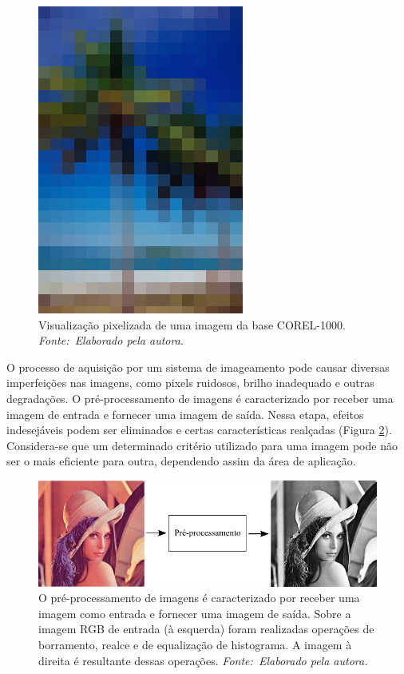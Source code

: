 \begin{figure}[!htbp]
 \begin{center}
   \includegraphics[width=0.4\linewidth]{figuras/pixel.jpg}
 \caption[Visualização pixelizada de uma imagem da base COREL-1000.]{Visualização pixelizada de uma imagem da base COREL-1000\footnotemark. \\ \textit{Fonte:~Elaborado pela autora.}}
 \label{fig:pixel}
 \end{center}
\end{figure}

O processo de aquisição por um sistema de imageamento pode causar diversas imperfeições nas imagens, como pixels ruidosos, brilho inadequado e outras degradações. O pré-processamento de imagens é caracterizado por receber uma imagem de entrada e fornecer uma imagem de saída. Nessa etapa, efeitos indesejáveis podem ser eliminados e certas características realçadas (Figura \ref{fig:preproc}). Considera-se que um determinado critério utilizado para uma imagem pode não ser o mais eficiente para outra, dependendo assim da área de aplicação.

\vspace{12pt}
\begin{figure}[!htbp]
 \begin{center}
   \includegraphics[width=1\linewidth]{figuras/preprocessamento.png}
 \caption[Sobre a imagem RGB de entrada foram realizadas operações de borramento, realce e de equalização de histograma. A imagem à direita é resultante dessas operações.]{O pré-processamento de imagens é caracterizado por receber uma imagem como entrada e fornecer uma imagem de saída. Sobre a imagem RGB de entrada (à esquerda) foram realizadas operações de borramento, realce e de equalização de histograma. A imagem à direita é resultante dessas operações. \textit{Fonte:~Elaborado pela autora.}}
 \label{fig:preproc}
 \end{center}
\end{figure}

